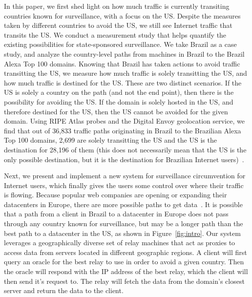 In this paper, we first shed light on how much traffic is currently transiting countries known for surveillance, with a focus on the US.  Despite the measures taken by different countries to avoid the US, we still see Internet traffic that transits the US.  We conduct a measurement study that helps quantify the existing possibilities for state-sponsored surveillance.  We take Brazil as a case study, and analyze the country-level paths from machines in Brazil to the Brazil Alexa Top 100 domains.  Knowing that Brazil has taken actions to avoid traffic transitting the US, we measure how much traffic is solely transitting the US, and how much traffic is destined for the US.  These are two distinct scenarios.  If the US is solely a country on the path (and not the end point), then there is the possibility for avoiding the US.  If the domain is solely hosted in the US, and therefore destined for the US, then the US cannot be avoided for the given domain.  Using RIPE Atlas probes and the Digital Envoy geolocation service, we find that out of 36,833 traffic paths originating in Brazil to the Brazilian Alexa Top 100 domains, 2,699 are solely transitting the US and the US is the destination for 28,196 of them (this does not necessarily mean that the US is the only possible destination, but it is the destination for Brazilian Internet users)~\cite{ripe_atlas, digital_envoy}.  

Next, we present and implement a new system for surveillance circumvention for Internet users, which finally gives the users some control over where their traffic is flowing.  Because popular web companies are opening or expanding their datacenters in Europe, there are more possible paths to get data~\cite{eu_datacenters}.  It is possible that a path from a client in Brazil to a datacenter in Europe does not pass through any country known for surveillance, but may be a longer path than the best path to a datacenter in the US, as shown in Figure~\ref{fig:intro}.  Our system leverages a geographically diverse set of relay machines that act as proxies to access data from servers located in different geographic regions.  A client will first query an oracle for the best relay to use in order to avoid a given country.  Then the oracle will respond with the IP address of the best relay, which the client will then send it's request to.  The relay will fetch the data from the domain's closest server and return the data to the client. 

